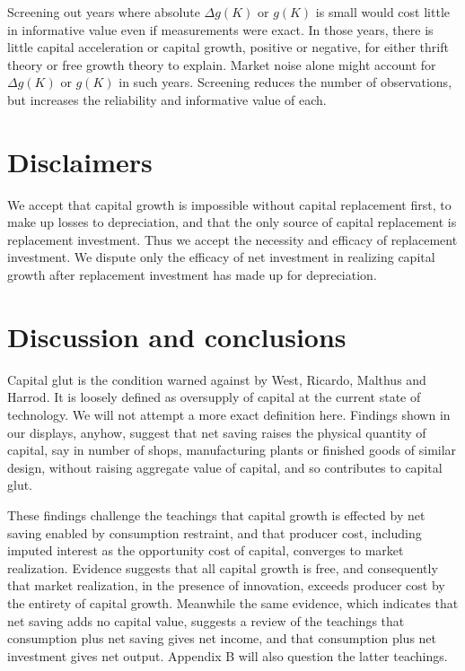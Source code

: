 \documentclass[a4paper,fleqn]{latex_styles/cas-sc}
\begin{document}
Screening out years where absolute \(\Delta g(K)\) or $g(K)$ is small would cost
little in informative value even if measurements were exact. In those
years, there is little capital acceleration or capital growth, positive or negative, for
either thrift theory or free growth theory to explain. Market noise
alone might account for \(\Delta g(K)\) or $g(K)$ in such years. Screening reduces
the number of observations, but increases the reliability and
informative value of each.

\hypertarget{disclaimers}{%
\section{Disclaimers}\label{disclaimers}}

We accept that capital growth is impossible without capital replacement first, to make up losses to depreciation, and that the only source of capital replacement is replacement investment. Thus we accept the necessity and efficacy of replacement investment. We dispute only the efficacy of net investment in realizing capital growth after replacement investment has made up for depreciation.

\hypertarget{discussion-and-conclusions}{%
\section{Discussion and conclusions}\label{discussion-and-conclusions}}

Capital glut is the condition warned against by West, Ricardo, Malthus
and Harrod. It is loosely defined as oversupply of capital at the
current state of technology. We will not attempt a more exact definition
here. Findings shown in our displays, anyhow, suggest that net
saving raises the physical quantity of capital, say in number of
shops, manufacturing plants or finished goods of similar design, without
raising aggregate value of capital, and so contributes to capital glut.

These findings challenge the teachings that capital growth is effected
by net saving enabled by consumption restraint, and that producer
cost, including imputed interest as the opportunity cost of capital,
converges to market realization. Evidence suggests that all capital growth is free, and
consequently that market realization, in the presence of innovation,
exceeds producer cost by the entirety of capital growth. Meanwhile the same evidence, which indicates that net saving adds no capital value, suggests a review of the teachings that consumption plus net saving gives net income, and that consumption plus net investment gives net output. Appendix B will also question the latter teachings.
\end{document}
